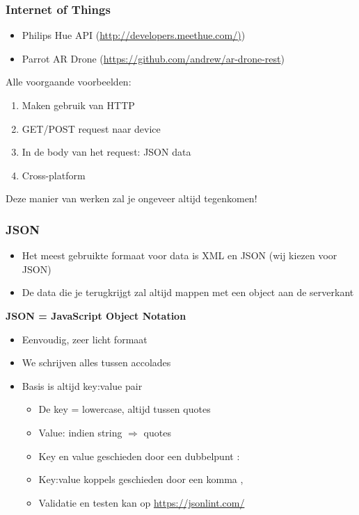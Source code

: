 \documentclass{article}
\newcommand{\bold}[1]{\textbf{#1}}
\begin{document}
\subsubsection{Internet of Things}
\begin{itemize}
    \item Philips Hue API (\url{http://developers.meethue.com/)})
    \item Parrot AR Drone (\url{https://github.com/andrew/ar-drone-rest})
\end{itemize}

Alle voorgaande voorbeelden:
\begin{enumerate}
    \item Maken gebruik van HTTP
    \item GET/POST request naar device
    \item In de body van het request: JSON data
    \item Cross-platform
\end{enumerate}

Deze manier van werken zal je ongeveer altijd tegenkomen!

\subsubsection{JSON}

\begin{itemize}
    \item Het meest gebruikte formaat voor data is XML en JSON (wij kiezen voor JSON)
    \item De data die je terugkrijgt zal altijd mappen met een object aan de serverkant
\end{itemize}

\bold{JSON = JavaScript Object Notation}

\begin{itemize}
    \item Eenvoudig, zeer licht formaat
    \item We schrijven alles tussen accolades
    \item Basis is altijd key:value pair
    \begin{itemize}
        \item De key = lowercase, altijd tussen quotes
        \item Value: indien string $\Rightarrow$ quotes
        \item Key en value geschieden door een dubbelpunt :
        \item Key:value koppels geschieden door een komma ,
    \end{itemize}
    \begin{itemize}
        \item Validatie en testen kan op \url{https://jsonlint.com/}
    \end{itemize}
\end{itemize}
\end{document}

